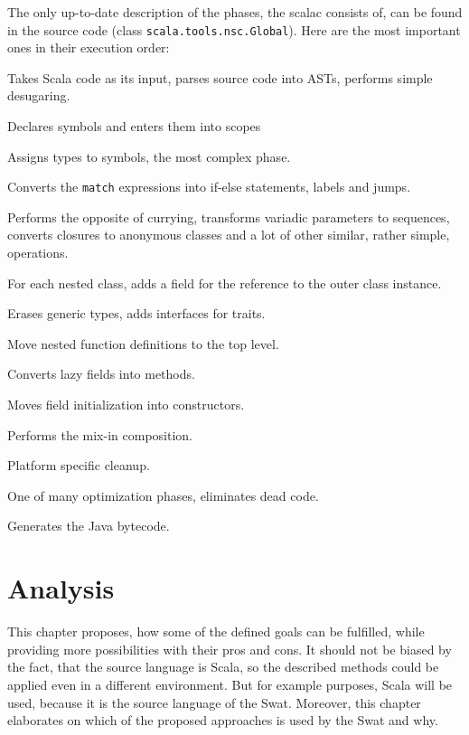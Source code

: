 \documentclass[12pt,a4paper]{report}
\begin{document}
The only up-to-date description of the phases, the scalac consists of, can be found in the source code (class \texttt{scala.tools.nsc.Global}). Here are the most important ones in their execution order:

\begin{description}[style=multiline,leftmargin=5cm]
\item[\texttt{syntaxAnalyzer}] Takes Scala code as its input, parses source code into ASTs, performs simple desugaring.
\item[\texttt{namerFactory}] Declares symbols and enters them into scopes
\item[\texttt{typerFactory}] Assigns types to symbols, the most complex phase.
\item[\texttt{patmat}] Converts the \texttt{match} expressions into if-else statements, labels and jumps.
\item[\texttt{uncurry}] Performs the opposite of currying, transforms variadic parameters to sequences, converts closures to anonymous classes and a lot of other similar, rather simple, operations. 
\item[\texttt{explicitOuter}] For each nested class, adds a field for the reference to the outer class instance. 
\item[\texttt{erasure}] Erases generic types, adds interfaces for traits.
\item[\texttt{lambdaLift}] Move nested function definitions to the top level.
\item[\texttt{lazyVals}] Converts lazy fields into methods.
\item[\texttt{constructors}] Moves field initialization into constructors.
\item[\texttt{mixer}] Performs the mix-in composition.
\item[\texttt{cleanup}] Platform specific cleanup.
\item[\texttt{deadCode}] One of many optimization phases, eliminates dead code.
\item[\texttt{jvm}] Generates the Java bytecode.
\end{description}



\chapter{Analysis}
\label{sec:Analysis}

This chapter proposes, how some of the defined goals can be fulfilled, while providing more possibilities with their pros and cons. It should not be biased by the fact, that the source language is Scala, so the described methods could be applied even in a different environment. But for example purposes, Scala will be used, because it is the source language of the Swat. Moreover, this chapter elaborates on which of the proposed approaches is used by the Swat and why.
\end{document}
